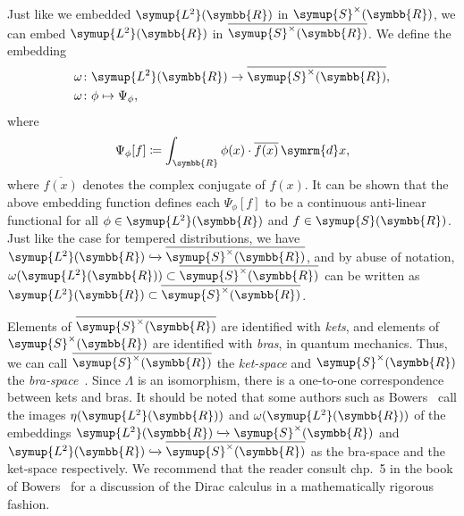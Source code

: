 \documentclass[11pt, a4paper]{article}
\theoremstyle{definition}
\newcommand{\ltwo}{\symup{L^2}}
\newcommand{\rr}{\symbb{R}}
\newcommand{\ltwor}{\ltwo(\rr)}
\newcommand{\schwartz}{\symup{S}}
\newcommand{\schwartzr}{\schwartz(\rr)}
\newcommand{\dist}{\schwartz^\times}
\newcommand{\distr}{\dist(\rr)}
\newcommand{\anti}{\overline{\distr}}
\newcommand{\der}{\mathop{}\!\symrm{d}}
\begin{document}
    Just like we embedded $\ltwor$ in $\distr$, we can embed $\ltwor$ in $\anti$. We define the embedding
    \begin{align*}
        \omega &\colon \ltwor \rightarrow \anti,\\
        \omega &\colon \phi \mapsto \Psi_\phi,
    \end{align*}
    where
    \[
    \Psi_\phi [f] \coloneq \int_{\rr} \phi(x) \cdot \overline{f(x)} \der x,
    \]
    where $\overline{f(x)}$ denotes the complex conjugate of $f(x)$.
    It can be shown that the above embedding function defines each $\Psi_\phi[f]$ to be a continuous anti-linear functional for all $\phi \in \ltwor$ and $f \in \schwartzr$. Just like the case for tempered distributions, we have $\ltwor \xhookrightarrow{} \anti$, and by abuse of notation, $\omega(\ltwor) \subset \anti$ can be written as $\ltwor \subset \anti$.

    Elements of $\anti$ are identified with \textit{kets}, and elements of $\distr$ are identified with \textit{bras}, in quantum mechanics. Thus, we can call $\anti$ the \textit{ket-space} and $\distr$ the \textit{bra-space}~\cite[p.~3]{Ticciati}. Since $\Lambda$ is an isomorphism, there is a one-to-one correspondence between kets and bras. It should be noted that some authors such as Bowers~\cite[chp.~5]{Bowers} call the images $\eta(\ltwor)$ and $\omega(\ltwor)$ of the embeddings $\ltwor \xhookrightarrow{} \distr$ and $\ltwor \xhookrightarrow{} \anti$ as the bra-space and the ket-space respectively. We recommend that the reader consult chp.~5 in the book of Bowers~\cite{Bowers} for a discussion of the Dirac calculus in a mathematically rigorous fashion.
\end{document}

